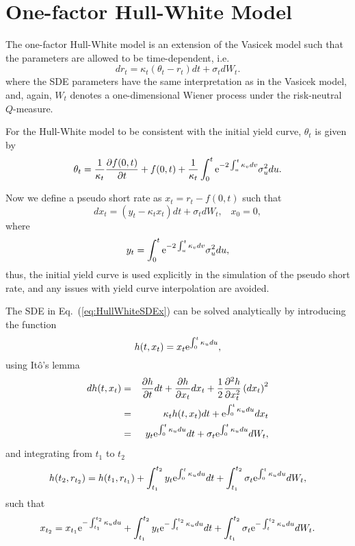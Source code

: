 \section{One-factor Hull-White Model}
The one-factor Hull-White model \cite{Hull1990} is an extension of the Vasicek model such that the parameters are allowed to be time-dependent, i.e.
\begin{equation}
dr_t = \kappa_t \left( \theta_t - r_t \right) dt + \sigma_t dW_t.
\end{equation}
where the SDE parameters have the same interpretation as in the Vasicek model, and, again, $W_t$ denotes a one-dimensional Wiener process under the risk-neutral $Q$-measure.

For the Hull-White model to be consistent with the initial yield curve, $\theta_t$ is given by \cite{Andersen2010}
\begin{equation}
\theta_t = \frac{1}{\kappa_t} \frac{\partial f(0,t)}{\partial t} + f(0,t) + \frac{1}{\kappa_t} \int_0^t \text{e}^{-2\int_u^t \kappa_v dv} \sigma_u^2 du.
\end{equation}

Now we define a pseudo short rate as $x_t = r_t - f(0,t)$ such that
\begin{equation}
dx_t = \left( y_t - \kappa_t x_t \right) dt + \sigma_t dW_t, \;\;\; x_0 = 0,
\label{eq:HullWhiteSDEx}
\end{equation}
where
\begin{equation}
y_t = \int_0^t \text{e}^{-2\int_u^t \kappa_v dv} \sigma_u^2 du,
\end{equation}
thus, the initial yield curve is used explicitly in the simulation of the pseudo 
short rate, and any issues with yield curve interpolation are avoided.

The SDE in Eq.~(\ref{eq:HullWhiteSDEx}) can be solved analytically by introducing the function
\begin{equation}
h(t, x_t) = x_t \text{e}^{\int_0^t \kappa_u du},
\end{equation}
using It\^{o}'s lemma
\begin{eqnarray}
dh(t, x_t) &=& \frac{\partial h}{\partial t} dt + \frac{\partial h}{\partial x_t} dx_t + \frac{1}{2}\frac{\partial^2 h}{\partial x_t^2} \left(dx_t\right)^2 \\
&=& \kappa_t h(t, x_t) dt + \text{e}^{\int_0^t \kappa_u du} dx_t \\
&=& y_t \text{e}^{\int_0^t \kappa_u du} dt + \sigma_t \text{e}^{\int_0^t \kappa_u du} dW_t,
\end{eqnarray}
and integrating from $t_1$ to $t_2$
\begin{equation}
h(t_2, r_{t_2}) = h(t_1, r_{t_1}) + \int_{t_1}^{t_2} y_t \text{e}^{\int_0^t \kappa_u du} dt + \int_{t_1}^{t_2} \sigma_t \text{e}^{\int_0^t \kappa_u du} dW_t,
\end{equation}
such that
\begin{equation}
x_{t_2} = x_{t_1} \text{e}^{-\int_{t_1}^{t_2} \kappa_u du}  + \int_{t_1}^{t_2} y_t \text{e}^{-\int_t^{t_2} \kappa_u du} dt + \int_{t_1}^{t_2} \sigma_t \text{e}^{-\int_t^{t_2} \kappa_u du} dW_t.
\end{equation}

